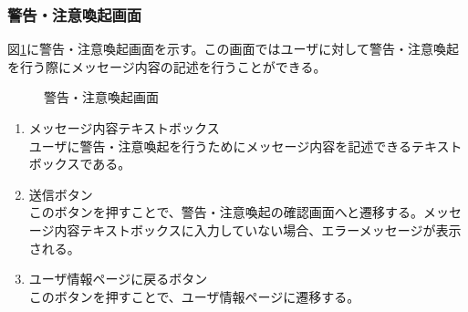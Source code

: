 \documentclass[a4j]{jarticle}
\begin{document}
\subsubsection{警告・注意喚起画面}
図\ref{fig:warning}に警告・注意喚起画面を示す。この画面ではユーザに対して警告・注意喚起を行う際にメッセージ内容の記述を行うことができる。

\begin{figure}[H]
\centering
{}
\caption{警告・注意喚起画面}
\label{fig:warning}
\end{figure}

\begin{enumerate}
  \renewcommand{\labelenumi}{\textcircled{\scriptsize \theenumi}}

\item メッセージ内容テキストボックス\\
ユーザに警告・注意喚起を行うためにメッセージ内容を記述できるテキストボックスである。
\item 送信ボタン\\
  このボタンを押すことで、警告・注意喚起の確認画面へと遷移する。メッセージ内容テキストボックスに入力していない場合、エラーメッセージが表示される。
\item ユーザ情報ページに戻るボタン\\
  このボタンを押すことで、ユーザ情報ページに遷移する。
\end{enumerate}
\end{document}
